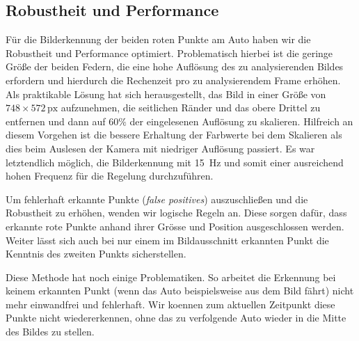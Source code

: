 \documentclass[10pt]{article}
\begin{document}
    \subsection{Robustheit und Performance}\label{sub:robustheit_und_performance}
        Für die Bilderkennung der beiden roten Punkte am Auto haben wir die Robustheit und Performance optimiert.
        Problematisch hierbei ist die geringe Größe der beiden Federn, die eine hohe Auflösung des zu analysierenden Bildes erfordern und hierdurch die Rechenzeit pro zu analysierendem Frame erhöhen.
        Als praktikable Lösung hat sich herausgestellt, das Bild in einer Größe von $748\times 572\,\text{px}$ aufzunehmen, die seitlichen Ränder und das obere Drittel zu entfernen und dann auf $60\%$ der eingelesenen Auflösung zu skalieren.
        Hilfreich an diesem Vorgehen ist die bessere Erhaltung der Farbwerte bei dem Skalieren als dies beim Auslesen der Kamera mit niedriger Auflösung passiert.
        Es war letztendlich möglich, die Bilderkennung mit \SI{15}{\hertz} und somit einer ausreichend hohen Frequenz für die Regelung durchzuführen.

        Um fehlerhaft erkannte Punkte (\textit{false positives}) auszuschließen und die Robustheit zu erhöhen, wenden wir logische Regeln an.
        Diese sorgen dafür, dass erkannte rote Punkte anhand ihrer Grösse und Position ausgeschlossen werden.
        Weiter lässt sich auch bei nur einem im Bildausschnitt erkannten Punkt die Kenntnis des zweiten Punkts sicherstellen.

        Diese Methode hat noch einige Problematiken.
        So arbeitet die Erkennung bei keinem erkannten Punkt (wenn das Auto beispielsweise \glqq{}aus dem Bild fährt\grqq{}) nicht mehr einwandfrei und fehlerhaft.
        Wir koennen zum aktuellen Zeitpunkt diese Punkte nicht wiedererkennen, ohne das zu verfolgende Auto wieder in die Mitte des Bildes zu stellen.
\end{document}
